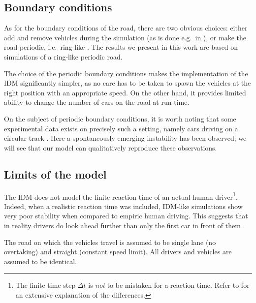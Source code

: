 \subsection{Boundary conditions}
As for the boundary conditions of the road, there are two obvious choices: either add and remove vehicles during the simulation (as is done e.g.\ in \cite{treiber1999}), or make the road periodic, i.e.\ ring-like \cite{treiber2015}. The results we present in this work are based on simulations of a ring-like periodic road.

The choice of the periodic boundary conditions makes the implementation of the IDM significantly simpler, as no care has to be taken to spawn the vehicles at the right position with an appropriate speed. On the other hand, it provides limited ability to change the number of cars on the road at run-time.

On the subject of periodic boundary conditions, it is worth noting that some experimental data exists on precisely such a setting, namely cars driving on a circular track \cite{nakayama2009,tadaki2013}. Here a spontaneously emerging instability has been observed; we will see that our model can qualitatively reproduce these observations.


\subsection{Limits of the model}
The IDM does not model the finite reaction time of an actual human driver\footnote{The finite time step $\Delta t$ is \emph{not} to be mistaken for a reaction time. Refer to \cite{treiber2006} for an extensive explanation of the differences.}. Indeed, when a realistic reaction time was included, IDM-like simulations show very poor stability when compared to empiric human driving. This suggests that in reality drivers do look ahead further than only the first car in front of them \cite{treiber2006}.

The road on which the vehicles travel is assumed to be single lane (no overtaking) and straight (constant speed limit). All drivers and vehicles are assumed to be identical.

